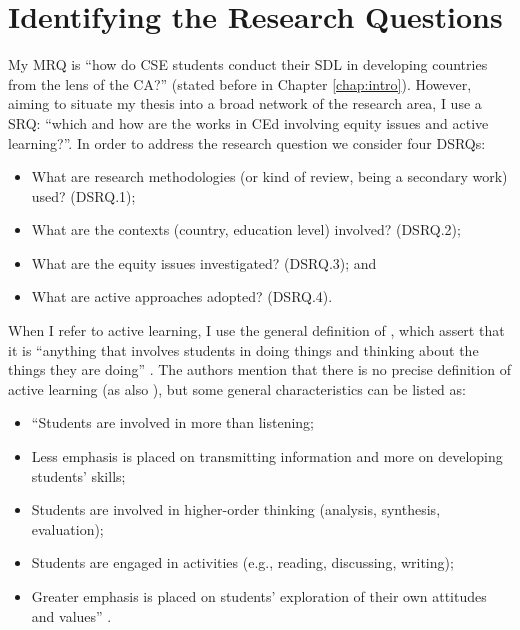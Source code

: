 \section{Identifying the Research Questions}
\label{rel-work:res-questions}

My \acrfull{MRQ} is “how do \acrfull{CSE} students conduct their \acrfull{SDL} in developing countries from the lens of the \acrfull{CA}?” (stated before in Chapter \ref{chap:intro}). However, aiming to situate my thesis into a broad network of the research area, I use a \gls{SRQ}: “which and how are the works in \acrfull{CEd} involving equity issues and active learning?”. In order to address the research question we consider four \glspl{DSRQ}:
\begin{itemize}
    \item What are research methodologies (or kind of review, being a secondary work) used? (\gls{DSRQ}.1);
    \item What are the contexts (country, education level) involved? (\gls{DSRQ}.2);
    \item What are the equity issues investigated? (\gls{DSRQ}.3); and
    \item What are active approaches adopted? (\gls{DSRQ}.4).
\end{itemize}

When I refer to active learning, I use the general definition of , which assert that it is “anything that involves students in doing things and thinking about the things they are doing” \cite[p.~19]{bonwell:1991}. The authors mention that there is no precise definition of active learning (as also ), but some general characteristics can be listed as:
\begin{itemize}
    \item “Students are involved in more than listening;
    \item Less emphasis is placed on transmitting information and more on developing students’ skills;
    \item Students are involved in higher-order thinking (analysis, synthesis, evaluation);
    \item Students are engaged in activities (e.g., reading, discussing, writing);
    \item Greater emphasis is placed on students’ exploration of their own attitudes and values” \cite[p.~19]{bonwell:1991}.
\end{itemize}

